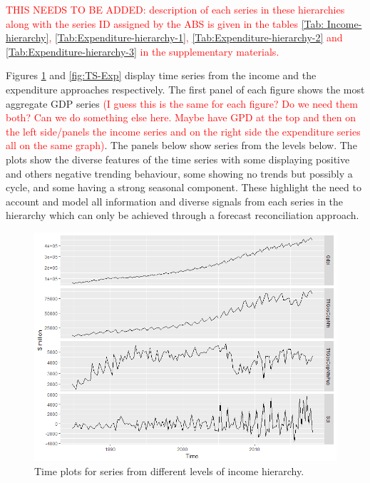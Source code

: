 \documentclass[graybox]{svmult}
\begin{document}
\textcolor{red}{THIS NEEDS TO BE ADDED: description of each series in these hierarchies along with the series ID assigned by the ABS is given in the tables \ref{Tab: Income-hierarchy}, \ref{Tab:Expenditure-hierarchy-1}, \ref{Tab:Expenditure-hierarchy-2} and \ref{Tab:Expenditure-hierarchy-3} in the supplementary materials.}

Figures \ref{fig:TS-Inc} and \ref{fig:TS-Exp} display time series from the income and the expenditure approaches respectively. The first panel of each figure shows the most aggregate GDP series \textcolor{red}{(I guess this is the same for each figure? Do we need them both? Can we do something else here. Maybe have GPD at the top and then on the left side/panels the income series and on the right side the expenditure series all on the same graph)}. The panels below show series from the levels below. The plots show the diverse features of the time series with some displaying positive and others negative trending behaviour, some showing no trends but possibly a cycle, and some having a strong seasonal component. These highlight the need to account and model all information and diverse signals from each series in the hierarchy which can only be achieved through a forecast reconciliation approach.


\begin{figure}[H]
	\centering
	\small
	\includegraphics[width=\textwidth]{Figs/TS-plots/INC-hierarchy/INC-char-of-levels-TSplots.png}
	\caption{Time plots for series from different levels of income hierarchy.}\label{fig:TS-Inc}
\end{figure}
\end{document}
